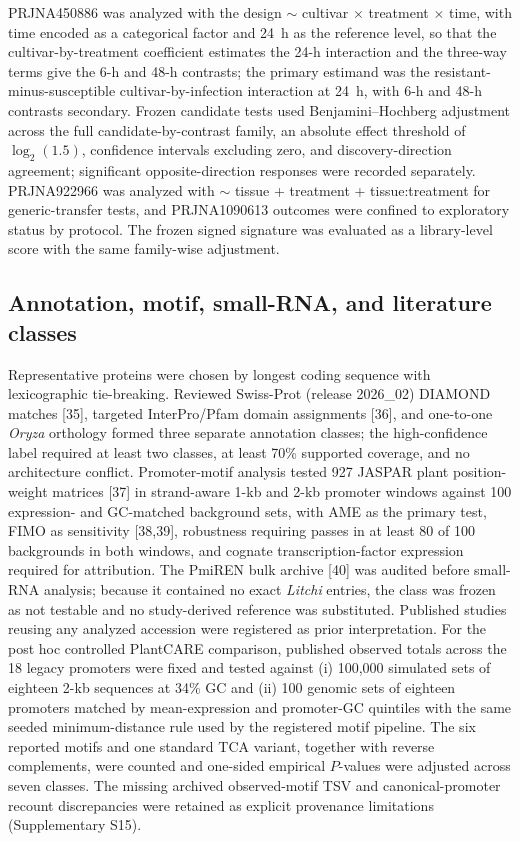 \documentclass[11pt]{article}
\begin{document}
PRJNA450886 was analyzed with the design $\sim$ cultivar $\times$ treatment $\times$ time, with time encoded as a categorical factor and 24~h as the reference level, so that the cultivar-by-treatment coefficient estimates the 24-h interaction and the three-way terms give the 6-h and 48-h contrasts; the primary estimand was the resistant-minus-susceptible cultivar-by-infection interaction at 24~h, with 6-h and 48-h contrasts secondary. Frozen candidate tests used Benjamini--Hochberg adjustment across the full candidate-by-contrast family, an absolute effect threshold of $\log_2(1.5)$, confidence intervals excluding zero, and discovery-direction agreement; significant opposite-direction responses were recorded separately. PRJNA922966 was analyzed with $\sim$ tissue + treatment + tissue:treatment for generic-transfer tests, and PRJNA1090613 outcomes were confined to exploratory status by protocol. The frozen signed signature was evaluated as a library-level score with the same family-wise adjustment.

\subsection{Annotation, motif, small-RNA, and literature classes}

Representative proteins were chosen by longest coding sequence with lexicographic tie-breaking. Reviewed Swiss-Prot (release 2026\_02) DIAMOND matches [35], targeted InterPro/Pfam domain assignments [36], and one-to-one \textit{Oryza} orthology formed three separate annotation classes; the high-confidence label required at least two classes, at least 70\% supported coverage, and no architecture conflict. Promoter-motif analysis tested 927 JASPAR plant position-weight matrices [37] in strand-aware 1-kb and 2-kb promoter windows against 100 expression- and GC-matched background sets, with AME as the primary test, FIMO as sensitivity [38,39], robustness requiring passes in at least 80 of 100 backgrounds in both windows, and cognate transcription-factor expression required for attribution. The PmiREN bulk archive [40] was audited before small-RNA analysis; because it contained no exact \textit{Litchi} entries, the class was frozen as not testable and no study-derived reference was substituted. Published studies reusing any analyzed accession were registered as prior interpretation. For the post hoc controlled PlantCARE comparison, published observed totals across the 18 legacy promoters were fixed and tested against (i) 100,000 simulated sets of eighteen 2-kb sequences at 34\% GC and (ii) 100 genomic sets of eighteen promoters matched by mean-expression and promoter-GC quintiles with the same seeded minimum-distance rule used by the registered motif pipeline. The six reported motifs and one standard TCA variant, together with reverse complements, were counted and one-sided empirical $P$-values were adjusted across seven classes. The missing archived observed-motif TSV and canonical-promoter recount discrepancies were retained as explicit provenance limitations (Supplementary S15).
\end{document}
